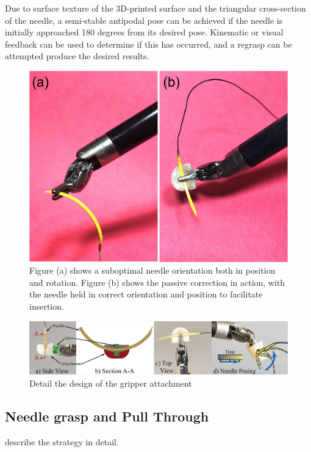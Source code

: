 \documentclass[0-suturing.tex]{subfiles}
\begin{document}
Due to surface texture of the $3$D-printed surface and the triangular cross-section of the needle, a semi-stable antipodal pose can be achieved if the needle is initially approached 180 degrees from its desired pose. Kinematic or visual feedback can be used to determine if this has occurred, and a regrasp can be attempted produce the desired results.


\begin{figure}[t!]
\centering
\includegraphics[width=0.95\linewidth]{figures/gripperAttachment}
\caption{Figure (a) shows a suboptimal needle orientation both in position and rotation. Figure (b) shows the passive correction in action, with the needle held in correct orientation and position to facilitate insertion. }
\label{fig:jawMount}
\vspace{-10pt}
\end{figure}


\begin{figure}[!t]
\centering
\includegraphics[width=\linewidth]{figures/NeedleGripper2-01}
\caption{Detail the design of the gripper attachment}
\label{fig:gripper design}
\vspace{-10pt}
\end{figure}

\subsection{Needle grasp and Pull Through}
describe the strategy in detail. 
\end{document}
